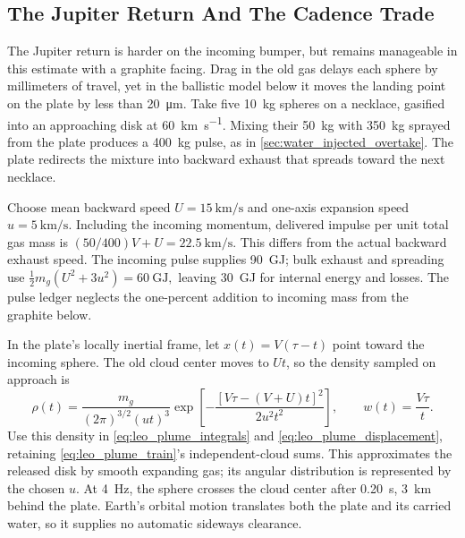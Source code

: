 \documentclass{article}
\begin{document}
\subsection{The Jupiter Return And The Cadence Trade}\label{sec:jovian_plume_encounter}
The Jupiter return is harder on the incoming bumper, but remains manageable in this estimate with a graphite facing. Drag in the old gas delays each sphere by millimeters of travel, yet in the ballistic model below it moves the landing point on the plate by less than \SI{20}{\micro\meter}. Take five \SI{10}{\kilogram} spheres on a necklace, gasified into an approaching disk at \SI{60}{\kilo\meter\per\second}. Mixing their \SI{50}{\kilogram} with \SI{350}{\kilogram} sprayed from the plate produces a \SI{400}{\kilogram} pulse, as in \autoref{sec:water_injected_overtake}. The plate redirects the mixture into backward exhaust that spreads toward the next necklace.

Choose mean backward speed $U=\SI{15}{\kilo\meter\per\second}$ and one-axis expansion speed $u=\SI{5}{\kilo\meter\per\second}$. Including the incoming momentum, delivered impulse per unit total gas mass is $(50/400)V+U=\SI{22.5}{\kilo\meter\per\second}$. This differs from the actual backward exhaust speed. The incoming pulse supplies \SI{90}{\giga\joule}; bulk exhaust and spreading use $\tfrac12m_g(U^2+3u^2)=\SI{60}{\giga\joule},$ leaving \SI{30}{\giga\joule} for internal energy and losses. The pulse ledger neglects the one-percent addition to incoming mass from the graphite below.

In the plate's locally inertial frame, let $x(t)=V(\tau-t)$ point toward the incoming sphere. The old cloud center moves to $Ut$, so the density sampled on approach is
\begin{equation}\label{eq:jovian_plume_density}
\rho(t)=\frac{m_g}{(2\pi)^{3/2}(ut)^3}
\exp\!\left[-\frac{[V\tau-(V+U)t]^2}{2u^2t^2}\right],
\qquad w(t)=\frac{V\tau}{t}.
\end{equation}
Use this density in \autoref{eq:leo_plume_integrals} and \autoref{eq:leo_plume_displacement}, retaining \autoref{eq:leo_plume_train}'s independent-cloud sums. This approximates the released disk by smooth expanding gas; its angular distribution is represented by the chosen $u$. At \SI{4}{\hertz}, the sphere crosses the cloud center after \SI{0.20}{\second}, \SI{3}{\kilo\meter} behind the plate. Earth's orbital motion translates both the plate and its carried water, so it supplies no automatic sideways clearance.
\end{document}
